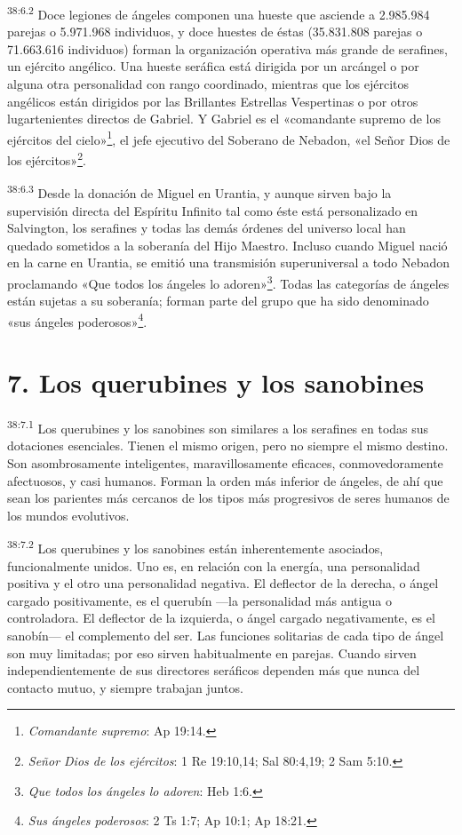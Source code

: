 \par
\textsuperscript{38:6.2} Doce legiones de ángeles componen una hueste que asciende a 2.985.984 parejas o 5.971.968 individuos, y doce huestes de éstas (35.831.808 parejas o 71.663.616 individuos) forman la organización operativa más grande de serafines, un ejército angélico. Una hueste seráfica está dirigida por un arcángel o por alguna otra personalidad con rango coordinado, mientras que los ejércitos angélicos están dirigidos por las Brillantes Estrellas Vespertinas o por otros lugartenientes directos de Gabriel. Y Gabriel es el «comandante supremo de los ejércitos del cielo»\footnote{\textit{Comandante supremo}: Ap 19:14.}, el jefe ejecutivo del Soberano de Nebadon, «el Señor Dios de los ejércitos»\footnote{\textit{Señor Dios de los ejércitos}: 1 Re 19:10,14; Sal 80:4,19; 2 Sam 5:10.}.

\par
\textsuperscript{38:6.3} Desde la donación de Miguel en Urantia, y aunque sirven bajo la supervisión directa del Espíritu Infinito tal como éste está personalizado en Salvington, los serafines y todas las demás órdenes del universo local han quedado sometidos a la soberanía del Hijo Maestro. Incluso cuando Miguel nació en la carne en Urantia, se emitió una transmisión superuniversal a todo Nebadon proclamando «Que todos los ángeles lo adoren»\footnote{\textit{Que todos los ángeles lo adoren}: Heb 1:6.}. Todas las categorías de ángeles están sujetas a su soberanía; forman parte del grupo que ha sido denominado «sus ángeles poderosos»\footnote{\textit{Sus ángeles poderosos}: 2 Ts 1:7; Ap 10:1; Ap 18:21.}.

\section*{7. Los querubines y los sanobines}
\par
\textsuperscript{38:7.1} Los querubines y los sanobines son similares a los serafines en todas sus dotaciones esenciales. Tienen el mismo origen, pero no siempre el mismo destino. Son asombrosamente inteligentes, maravillosamente eficaces, conmovedoramente afectuosos, y casi humanos. Forman la orden más inferior de ángeles, de ahí que sean los parientes más cercanos de los tipos más progresivos de seres humanos de los mundos evolutivos.

\par
\textsuperscript{38:7.2} Los querubines y los sanobines están inherentemente asociados, funcionalmente unidos. Uno es, en relación con la energía, una personalidad positiva y el otro una personalidad negativa. El deflector de la derecha, o ángel cargado positivamente, es el querubín ---la personalidad más antigua o controladora. El deflector de la izquierda, o ángel cargado negativamente, es el sanobín--- el complemento del ser. Las funciones solitarias de cada tipo de ángel son muy limitadas; por eso sirven habitualmente en parejas. Cuando sirven independientemente de sus directores seráficos dependen más que nunca del contacto mutuo, y siempre trabajan juntos.

